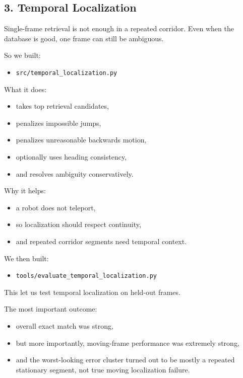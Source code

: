 \documentclass[11pt,a4paper]{article}
\begin{document}
\subsection{3. Temporal Localization}

Single-frame retrieval is not enough in a repeated corridor.  Even when the
database is good, one frame can still be ambiguous.

So we built:

\begin{itemize}[nosep]
  \item \texttt{src/temporal\_localization.py}
\end{itemize}

What it does:

\begin{itemize}[nosep]
  \item takes top retrieval candidates,
  \item penalizes impossible jumps,
  \item penalizes unreasonable backwards motion,
  \item optionally uses heading consistency,
  \item and resolves ambiguity conservatively.
\end{itemize}

Why it helps:

\begin{itemize}[nosep]
  \item a robot does not teleport,
  \item so localization should respect continuity,
  \item and repeated corridor segments need temporal context.
\end{itemize}

We then built:

\begin{itemize}[nosep]
  \item \texttt{tools/evaluate\_temporal\_localization.py}
\end{itemize}

This let us test temporal localization on held-out frames.

The most important outcome:

\begin{itemize}[nosep]
  \item overall exact match was strong,
  \item but more importantly, moving-frame performance was extremely strong,
  \item and the worst-looking error cluster turned out to be mostly a repeated
        stationary segment, not true moving localization failure.
\end{itemize}
\end{document}

